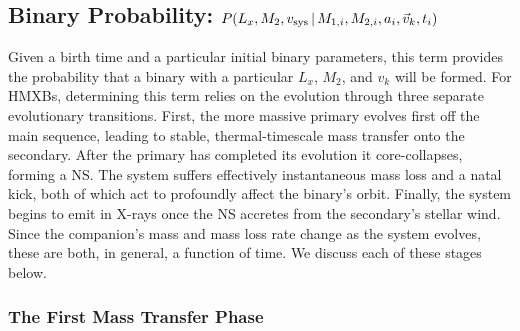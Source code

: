 \documentclass[12pt, preprint]{aastex}
\newcommand{\given}{\,|\,}
\begin{document}
\subsection{Binary Probability: $P(L_x, M_2, v_{\rm sys} \given M_{1,i}, M_{2,i}, a_i, \vec{v}_k, t_i)$} \label{sec:binary_evolve}

Given a birth time and a particular initial binary parameters, this term provides the probability that a binary with a particular $L_x$, $M_2$, and $v_k$ will be formed. For HMXBs, determining this term relies on the evolution through three separate evolutionary transitions. First, the more massive primary evolves first off the main sequence, leading to stable, thermal-timescale mass transfer onto the secondary. After the primary has completed its evolution it core-collapses, forming a NS. The system suffers effectively instantaneous mass loss and a natal kick, both of which act to profoundly affect the binary's orbit. Finally, the system begins to emit in X-rays once the NS accretes from the secondary's stellar wind. Since the companion's mass and mass loss rate change as the system evolves, these are both, in general, a function of time. We discuss each of these stages below.









\subsubsection{The First Mass Transfer Phase} \label{sec:trans_MT}
\end{document}
